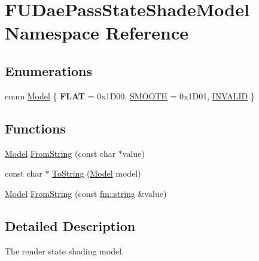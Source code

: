 \hypertarget{namespaceFUDaePassStateShadeModel}{
\section{FUDaePassStateShadeModel Namespace Reference}
\label{namespaceFUDaePassStateShadeModel}
}
\subsection*{Enumerations}
\begin{DoxyCompactItemize}
\item 
enum \hyperlink{namespaceFUDaePassStateShadeModel_a064ef370ffcebcea8ed5a4b2f9bcf7a1}{Model} \{ {\bfseries FLAT} =  0x1D00, 
\hyperlink{namespaceFUDaePassStateShadeModel_a064ef370ffcebcea8ed5a4b2f9bcf7a1ad75a25cbf38d18482f85798a496c4b50}{SMOOTH} =  0x1D01, 
\hyperlink{namespaceFUDaePassStateShadeModel_a064ef370ffcebcea8ed5a4b2f9bcf7a1af368b5304b55a1f1104d75ccea094337}{INVALID}
 \}
\end{DoxyCompactItemize}
\subsection*{Functions}
\begin{DoxyCompactItemize}
\item 
\hyperlink{namespaceFUDaePassStateShadeModel_a064ef370ffcebcea8ed5a4b2f9bcf7a1}{Model} \hyperlink{namespaceFUDaePassStateShadeModel_a2cf15df756b082b66649c373ab8df85a}{FromString} (const char $\ast$value)
\item 
const char $\ast$ \hyperlink{namespaceFUDaePassStateShadeModel_a726a28704b8c2b6a332d851f8e7887b0}{ToString} (\hyperlink{namespaceFUDaePassStateShadeModel_a064ef370ffcebcea8ed5a4b2f9bcf7a1}{Model} model)
\item 
\hyperlink{namespaceFUDaePassStateShadeModel_a064ef370ffcebcea8ed5a4b2f9bcf7a1}{Model} \hyperlink{namespaceFUDaePassStateShadeModel_a5bee3f41c4858c1872b2f0e265a198f9}{FromString} (const \hyperlink{classfm_1_1stringT}{fm::string} \&value)
\end{DoxyCompactItemize}


\subsection{Detailed Description}
The render state shading model. 

